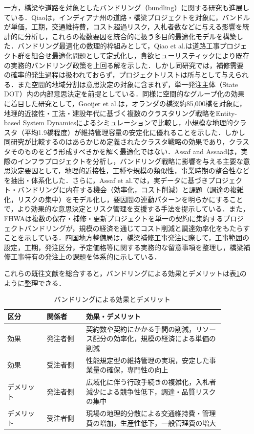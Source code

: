 \documentclass[Journal,letterpaper,InsideFigs,NoLineNumbers]{ascelike-new}
\begin{document}
一方，橋梁や道路を対象としたバンドリング（bundling）に関する研究も進展している．Qiao\cite{qiao2019}は，インディアナ州の道路・橋梁プロジェクトを対象に，バンドルが単価，工期，交通維持費，コスト超過リスク，入札者数などに与える影響を統計的に分析し，これらの複数要因を統合的に扱う多目的最適化モデルを構築した．バンドリング最適化の数理的枠組みとして，Qiao et al.\cite{qiao2026}は道路工事プロジェクト群を組合せ最適化問題として定式化し，貪欲ヒューリスティックにより既存の実務的バンドリング政策を上回る解を示した．しかし同研究では，補修需要の確率的発生過程は扱われておらず，プロジェクトリストは所与として与えられる．また空間的地域分割は意思決定の対象に含まれず，単一発注主体（State DOT）内の内部意思決定を前提としている．同様に空間的なグループ化の効果に着目した研究として，Gooijer et al.\cite{gooijer2024}は，オランダの橋梁約85,000橋を対象に，地理的近接性・工法・建設年代に基づく複数のクラスタリング戦略をEntity-based System Dynamicsによるシミュレーションで比較し，小規模な地理的クラスタ（平均1.9橋程度）が維持管理容量の安定化に優れることを示した．しかし同研究が比較するのはあらかじめ定義されたクラスタ戦略の効果であり，クラスタそのものをどう形成すべきかを解く最適化ではない．Assaf and Assaad\cite{assaf2023}は，実際のインフラプロジェクトを分析し，バンドリング戦略に影響を与える主要な意思決定要因として，地理的近接性，工種や規模の類似性，事業時期の整合性などを抽出・体系化した．さらに，Assaf et al.\cite{assaf2024}では，実データに基づきプロジェクト・バンドリングに内在する機会（効率化，コスト削減）と課題（調達の複雑化，リスクの集中）をモデル化し，要因間の連動パターンを明らかにすることで，より効果的な意思決定とリスク管理を支援する手法を提示している．また，FHWAは複数の保存・補修・更新プロジェクトを単一の契約に集約するプロジェクトバンドリングが，規模の経済を通じてコスト削減と調達効率化をもたらすことを示している\cite{fhwafactsheet}．四国地方整備局\cite{shikoku2019}は，橋梁補修工事発注に際して，工事範囲の設定，工期，発注区分，予定価格等に関する実務的な留意事項を整理し，橋梁補修工事特有の発注上の課題を体系的に示している．

これらの既往文献を総合すると，バンドリングによる効果とデメリットは表\ref{tab:bundling}のように整理できる．

\begin{table}[h]
\centering
\caption{バンドリングによる効果とデメリット}
\label{tab:bundling}
\begin{tabular}{p{0.16\linewidth}p{0.16\linewidth}p{0.56\linewidth}}
\toprule
区分 & 関係者 & 効果・デメリット \\
\midrule
効果 & 発注者側 & 契約数や契約にかかる手間の削減，リソース配分の効率化，規模の経済による単価の削減 \\
効果 & 受注者側 & 性能規定型の維持管理の実現，安定した事業量の確保，専門性の向上 \\
デメリット & 発注者側 & 広域化に伴う行政手続きの複雑化，入札者減少による競争性低下，調達・品質リスクの集中 \\
デメリット & 受注者側 & 現場の地理的分散による交通維持費・管理費の増加，生産性低下，一般管理費の増大 \\
\bottomrule
\end{tabular}
\end{table}
\end{document}
